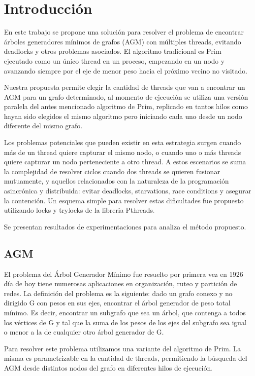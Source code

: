 \section{Introducción}

En este trabajo se propone una solución para resolver el problema de encontrar árboles generadores mínimos de grafos (AGM) con múltiples threads, evitando deadlocks y otros problemas asociados. El algoritmo tradicional es Prim ejecutado como un único thread en un proceso, empezando en un nodo y avanzando siempre por el eje de menor peso hacia el próximo vecino no visitado.

Nuestra propuesta permite elegir la cantidad de threads que van a encontrar un AGM para un grafo determinado, al momento de ejecución se utiliza una versión paralela del antes mencionado algoritmo de Prim, replicado en tantos hilos como hayan sido elegidos el mismo algoritmo pero iniciando cada uno desde un nodo diferente del mismo grafo.

Los problemas potenciales que pueden existir en esta estrategia surgen cuando más de un thread quiere capturar el mismo nodo, o cuando uno o más threads quiere capturar un nodo perteneciente a otro thread. A estos escenarios se suma la complejidad de resolver ciclos cuando dos threads se quieren fusionar mutuamente, y aquellos relacionados con la naturaleza de la programación asincrónica y distribuida: evitar deadlocks, starvations, race conditions y asegurar la contención. Un esquema simple para resolver estas dificultades fue propuesto utilizando locks y trylocks de la libreria Pthreads.

Se presentan resultados de experimentaciones para analiza el método propuesto.

\subsection{AGM}

El problema del Árbol Generador Mínimo fue resuelto por primera vez en 1926 día de hoy tiene numerosas aplicaciones en organización, ruteo y partición de redes. La definición del problema es la siguiente: dado un grafo conexo y no dirigido G con pesos en sus ejes, encontrar el árbol generador de peso total mínimo. Es decir, encontrar un subgrafo que sea un árbol, que contenga a todos los vértices de G y tal que la suma de los pesos de los ejes del subgrafo sea igual o menor a la de cualquier otro árbol generador de G.

Para resolver este problema utilizamos una variante del algoritmo de Prim. La misma es parametrizable en la cantidad de threads, permitiendo la búsqueda del AGM desde distintos nodos del grafo en diferentes hilos de ejecución.

